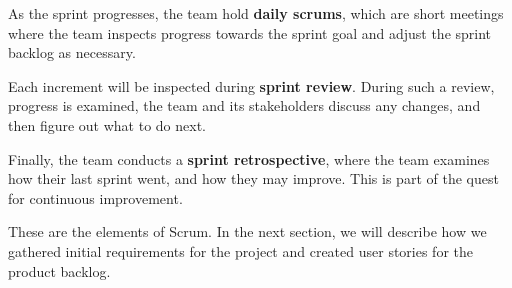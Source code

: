 As the sprint progresses, the team hold \textbf{daily scrums}, which are short meetings where the team inspects progress towards the sprint goal and adjust the sprint backlog as necessary.

Each increment will be inspected during \textbf{sprint review}. During such a review, progress is examined, the team and its stakeholders discuss any changes, and then figure out what to do next.

Finally, the team conducts a \textbf{sprint retrospective}, where the team examines how their last sprint went, and how they may improve. This is part of the quest for continuous improvement.

These are the elements of Scrum. In the next section, we will describe how we gathered initial requirements for the project and created user stories for the product backlog.